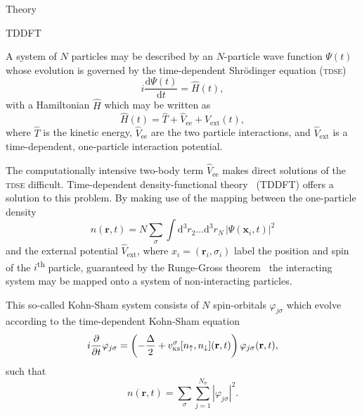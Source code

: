 \documentclass[aps, pra, reprint, groupedaddress, amsfonts,
               amsmath, amssymb, showpacs, nofootinbib]{revtex4-1}
\begin{document}
\begin{section}{Theory \label{sec:theory}}

   \begin{subsection}{TDDFT \label{sec:tddft}}

      A system of $N$ particles may be described by an $N$-particle wave function $\Psi(t)$ whose
      evolution is governed by the time-dependent Shr\"{o}dinger equation (\textsc{tdse})
      \begin{equation} \label{eq:tdse}
         i \frac{\mathrm{d} \Psi(t)}{\mathrm{d}t} = \hat{H}(t),
      \end{equation}
      with a Hamiltonian $\hat{H}$ which may be written as
      \begin{equation} \label{eq:ham}
         \hat{H}(t) = \hat{T} + \hat{V}_\mathrm{ee} + \hat{V}_\mathrm{ext}(t),
      \end{equation}
      where $\hat{T}$ is the kinetic energy, $\hat{V}_\mathrm{ee}$ are the two particle interactions,
      and $\hat{V}_\mathrm{ext}$ is a time-dependent, one-particle interaction potential.

      The computationally intensive two-body term $\hat{V}_\mathrm{ee}$ makes direct solutions of the
      \textsc{tdse} difficult. Time-dependent density-functional theory~\cite{tddft, ullrich} (TDDFT)
      offers a solution to this problem. By making use of the mapping between the one-particle density
      \begin{equation} \label{eq:dendef}
         n(\mathbf{r},t) = N \sum\limits_{\sigma} \int \mathrm{d}^3 r_2 \dots \mathrm{d}^3 r_N \,
                            \left| \Psi(\mathbf{x}_i,t) \right|^2
      \end{equation}
      and the external potential $\hat{V}_\mathrm{ext}$, where $x_i = (\mathbf{r}_i, \sigma_i)$ label
      the position and spin of the $i$\textsuperscript{th} particle, guaranteed by the Runge-Gross
      theorem~\cite{rg_theorem, td-spindep} the interacting system may be mapped onto a system of
      non-interacting particles.

      This so-called Kohn-Sham system consists of $N$ spin-orbitals $\varphi_{j \sigma}$ which evolve
      according to the time-dependent Kohn-Sham equation
      \begin{equation} \label{eq:tdks}
         i \frac{\partial}{\partial t} \varphi_{j\sigma} = \left( -\frac{\Delta}{2} +
               v^\sigma_\mathrm{\textsc{ks}}[n_\uparrow, n_\downarrow](\mathbf{r},t)
               \right) \varphi_{j\sigma}(\mathbf{r},t),
      \end{equation}
      such that
      \begin{equation} \label{eq:ksden}
         n(\mathbf{r},t) = \sum\limits_\sigma \sum\limits_{j=1}^{N_\sigma}
                           \left| \varphi_{j\sigma} \right|^2.
      \end{equation}
      

\end{subsection}
\end{section}
\end{document}
